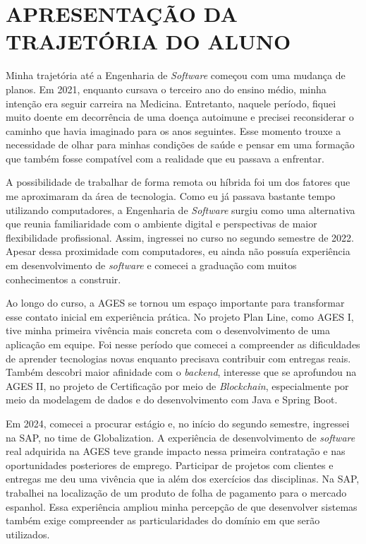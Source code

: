 \chapter[APRESENTAÇÃO DA TRAJETÓRIA DO ALUNO]{APRESENTAÇÃO DA TRAJETÓRIA DO ALUNO}

Minha trajetória até a Engenharia de \textit{Software} começou com uma mudança de planos. Em 2021, enquanto cursava o terceiro ano do ensino médio, minha intenção era seguir carreira na Medicina. Entretanto, naquele período, fiquei muito doente em decorrência de uma doença autoimune e precisei reconsiderar o caminho que havia imaginado para os anos seguintes. Esse momento trouxe a necessidade de olhar para minhas condições de saúde e pensar em uma formação que também fosse compatível com a realidade que eu passava a enfrentar.

A possibilidade de trabalhar de forma remota ou híbrida foi um dos fatores que me aproximaram da área de tecnologia. Como eu já passava bastante tempo utilizando computadores, a Engenharia de \textit{Software} surgiu como uma alternativa que reunia familiaridade com o ambiente digital e perspectivas de maior flexibilidade profissional. Assim, ingressei no curso no segundo semestre de 2022. Apesar dessa proximidade com computadores, eu ainda não possuía experiência em desenvolvimento de \textit{software} e comecei a graduação com muitos conhecimentos a construir.

Ao longo do curso, a \ac{AGES} se tornou um espaço importante para transformar esse contato inicial em experiência prática. No projeto Plan Line, como \ac{AGES} I, tive minha primeira vivência mais concreta com o desenvolvimento de uma aplicação em equipe. Foi nesse período que comecei a compreender as dificuldades de aprender tecnologias novas enquanto precisava contribuir com entregas reais. Também descobri maior afinidade com o \textit{backend}, interesse que se aprofundou na \ac{AGES} II, no projeto de Certificação por meio de \textit{Blockchain}, especialmente por meio da modelagem de dados e do desenvolvimento com Java e Spring Boot.

Em 2024, comecei a procurar estágio e, no início do segundo semestre, ingressei na SAP, no time de Globalization. A experiência de desenvolvimento de \textit{software} real adquirida na \ac{AGES} teve grande impacto nessa primeira contratação e nas oportunidades posteriores de emprego. Participar de projetos com clientes e entregas me deu uma vivência que ia além dos exercícios das disciplinas. Na SAP, trabalhei na localização de um produto de folha de pagamento para o mercado espanhol. Essa experiência ampliou minha percepção de que desenvolver sistemas também exige compreender as particularidades do domínio em que serão utilizados.

